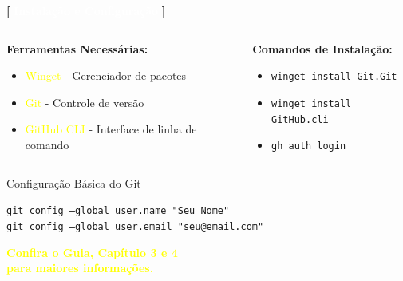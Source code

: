 \documentclass[10pt, brazil]{beamer}
\begin{document}
\begin{frame}{\textcolor{lightpurple}{\textbf{[}} \textbf{\textcolor{white}{Instalação e Configuração}} \textcolor{lightpurple}{\textbf{]}}}
  
  \begin{columns}
    \begin{column}{0.5\textwidth}
      \textbf{Ferramentas Necessárias:}
      \begin{itemize}
        \item \textcolor{yellow}{Winget} - Gerenciador de pacotes
        \item \textcolor{yellow}{Git} - Controle de versão
        \item \textcolor{yellow}{GitHub CLI} - Interface de linha de comando
      \end{itemize}
    \end{column}
    \begin{column}{0.5\textwidth}
      \textbf{Comandos de Instalação:}
      \begin{scriptsize}
        \begin{itemize}
          \item \texttt{winget install Git.Git}
          \item \texttt{winget install GitHub.cli}
          \item \texttt{gh auth login}
        \end{itemize}
      \end{scriptsize}
    \end{column}
  \end{columns}

  \vspace{1em}

  \begin{block}{Configuração Básica do Git}
    \begin{scriptsize}
      \texttt{git config --global user.name "Seu Nome"}\\
      \texttt{git config --global user.email "seu@email.com"}
    \end{scriptsize}
    \begin{center}
      \textcolor{yellow}{\textbf{Confira o Guia, Capítulo 3 e 4\\
      para maiores informações.}}
    \end{center}
  \end{block}

\end{frame}
\end{document}
